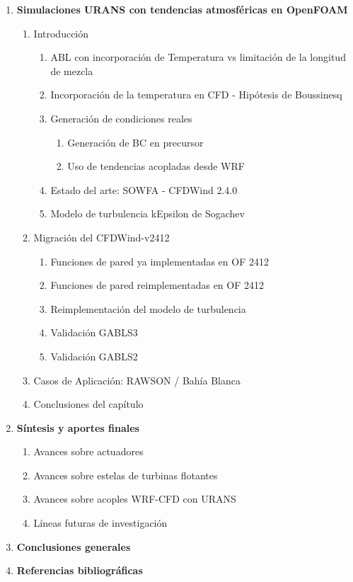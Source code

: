 \begin{enumerate}
\begin{enumerate}[label*=\arabic*.]
 \item Conclusiones del capítulo
    \end{enumerate}

  \item \textbf{Simulaciones URANS con tendencias atmosféricas en OpenFOAM}
  \begin{enumerate}[label*=\arabic*.]
    \item Introducción
    \begin{enumerate}[label*=\arabic*.]
    	  \item ABL con incorporación de Temperatura vs limitación de la longitud de mezcla
      \item Incorporación de la temperatura en CFD - Hipótesis de Boussinesq
      \item Generación de condiciones reales
      \begin{enumerate}[label*=\arabic*.]
      	\item Generación de BC en precursor
      	\item Uso de tendencias acopladas desde WRF
      \end{enumerate}
      \item Estado del arte: SOWFA - CFDWind 2.4.0
      \item Modelo de turbulencia kEpsilon de Sogachev
    \end{enumerate}
	\item Migración del CFDWind-v2412
	\begin{enumerate}[label*=\arabic*.]
		\item Funciones de pared ya implementadas en OF 2412
		\item Funciones de pared reimplementadas en OF 2412
		\item Reimplementación del modelo de turbulencia
		\item Validación GABLS3
		\item Validación GABLS2
	\end{enumerate}	  
	\item Casos de Aplicación: RAWSON / Bahía Blanca
    \item Conclusiones del capítulo 
  \end{enumerate}

  \item \textbf{Síntesis y aportes finales}
  \begin{enumerate}[label*=\arabic*.]
    \item Avances sobre actuadores
    \item Avances sobre estelas de turbinas flotantes
    \item Avances sobre acoples WRF-CFD con URANS
    \item Líneas futuras de investigación
  \end{enumerate}

  \item \textbf{Conclusiones generales}

  \item \textbf{Referencias bibliográficas}
\end{enumerate}